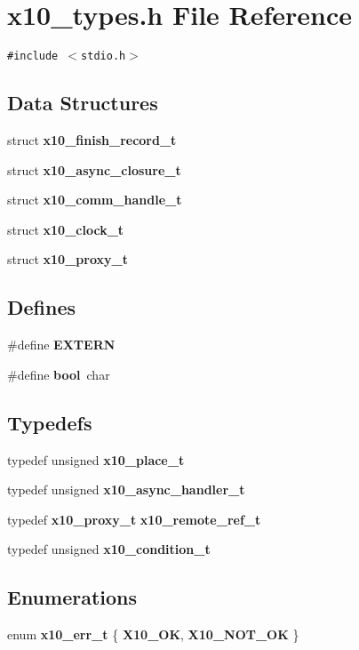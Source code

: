 \section{x10\_\-types.h File Reference}
\label{x10__types_8h}
{\tt \#include $<$stdio.h$>$}\par
\subsection*{Data Structures}
\begin{CompactItemize}
\item 
struct {\bf x10\_\-finish\_\-record\_\-t}
\item 
struct {\bf x10\_\-async\_\-closure\_\-t}
\item 
struct {\bf x10\_\-comm\_\-handle\_\-t}
\item 
struct {\bf x10\_\-clock\_\-t}
\item 
struct {\bf x10\_\-proxy\_\-t}
\end{CompactItemize}
\subsection*{Defines}
\begin{CompactItemize}
\item 
\#define {\bf EXTERN}
\item 
\#define {\bf bool}\ char
\end{CompactItemize}
\subsection*{Typedefs}
\begin{CompactItemize}
\item 
typedef unsigned {\bf x10\_\-place\_\-t}
\item 
typedef unsigned {\bf x10\_\-async\_\-handler\_\-t}
\item 
typedef {\bf x10\_\-proxy\_\-t} {\bf x10\_\-remote\_\-ref\_\-t}
\item 
typedef unsigned {\bf x10\_\-condition\_\-t}
\end{CompactItemize}
\subsection*{Enumerations}
\begin{CompactItemize}
\item 
enum {\bf x10\_\-err\_\-t} \{ {\bf X10\_\-OK}, 
{\bf X10\_\-NOT\_\-OK}
 \}
\end{CompactItemize}


